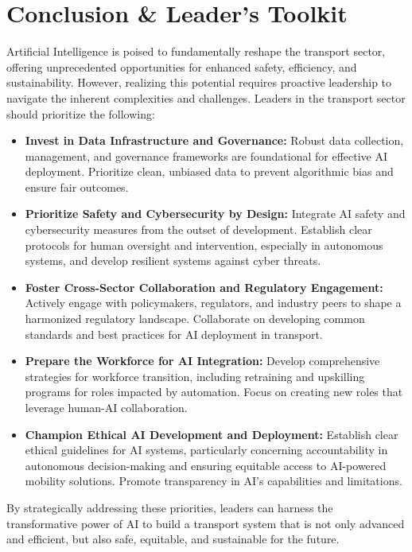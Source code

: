 \section{Conclusion \& Leader's Toolkit}

Artificial Intelligence is poised to fundamentally reshape the transport sector, offering unprecedented opportunities for enhanced safety, efficiency, and sustainability. However, realizing this potential requires proactive leadership to navigate the inherent complexities and challenges. Leaders in the transport sector should prioritize the following:

\begin{itemize}
    \item \textbf{Invest in Data Infrastructure and Governance:} Robust data collection, management, and governance frameworks are foundational for effective AI deployment. Prioritize clean, unbiased data to prevent algorithmic bias and ensure fair outcomes.
    \item \textbf{Prioritize Safety and Cybersecurity by Design:} Integrate AI safety and cybersecurity measures from the outset of development. Establish clear protocols for human oversight and intervention, especially in autonomous systems, and develop resilient systems against cyber threats.
    \item \textbf{Foster Cross-Sector Collaboration and Regulatory Engagement:} Actively engage with policymakers, regulators, and industry peers to shape a harmonized regulatory landscape. Collaborate on developing common standards and best practices for AI deployment in transport.
    \item \textbf{Prepare the Workforce for AI Integration:} Develop comprehensive strategies for workforce transition, including retraining and upskilling programs for roles impacted by automation. Focus on creating new roles that leverage human-AI collaboration.
    \item \textbf{Champion Ethical AI Development and Deployment:} Establish clear ethical guidelines for AI systems, particularly concerning accountability in autonomous decision-making and ensuring equitable access to AI-powered mobility solutions. Promote transparency in AI's capabilities and limitations.
\end{itemize}

By strategically addressing these priorities, leaders can harness the transformative power of AI to build a transport system that is not only advanced and efficient, but also safe, equitable, and sustainable for the future.
